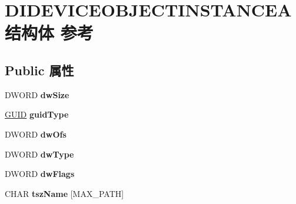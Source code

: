 \hypertarget{struct_d_i_d_e_v_i_c_e_o_b_j_e_c_t_i_n_s_t_a_n_c_e_a}{}\section{D\+I\+D\+E\+V\+I\+C\+E\+O\+B\+J\+E\+C\+T\+I\+N\+S\+T\+A\+N\+C\+E\+A结构体 参考}
\label{struct_d_i_d_e_v_i_c_e_o_b_j_e_c_t_i_n_s_t_a_n_c_e_a}
\subsection*{Public 属性}
\begin{DoxyCompactItemize}
\item 
\mbox{\label{struct_d_i_d_e_v_i_c_e_o_b_j_e_c_t_i_n_s_t_a_n_c_e_a_a0d55894b80f8e6ec487e7e7aa6f71254}} 
D\+W\+O\+RD {\bfseries dw\+Size}
\item 
\mbox{\label{struct_d_i_d_e_v_i_c_e_o_b_j_e_c_t_i_n_s_t_a_n_c_e_a_a670f89173fa4625ce5e57278050a887f}} 
\hyperlink{interface_g_u_i_d}{G\+U\+ID} {\bfseries guid\+Type}
\item 
\mbox{\label{struct_d_i_d_e_v_i_c_e_o_b_j_e_c_t_i_n_s_t_a_n_c_e_a_a16bb7716c0c959f048226ea0b8c190bd}} 
D\+W\+O\+RD {\bfseries dw\+Ofs}
\item 
\mbox{\label{struct_d_i_d_e_v_i_c_e_o_b_j_e_c_t_i_n_s_t_a_n_c_e_a_abbd0ecf057054a822de3174c511c5fd1}} 
D\+W\+O\+RD {\bfseries dw\+Type}
\item 
\mbox{\label{struct_d_i_d_e_v_i_c_e_o_b_j_e_c_t_i_n_s_t_a_n_c_e_a_a1ecf2634b90d68931f9790e84ef1cb5f}} 
D\+W\+O\+RD {\bfseries dw\+Flags}
\item 
\mbox{\label{struct_d_i_d_e_v_i_c_e_o_b_j_e_c_t_i_n_s_t_a_n_c_e_a_aec932f05a7ebb2b5cba0503424626aae}} 
C\+H\+AR {\bfseries tsz\+Name} \mbox{[}M\+A\+X\+\_\+\+P\+A\+TH\mbox{]}
\item 
\mbox{\label{struct_d_i_d_e_v_i_c_e_o_b_j_e_c_t_i_n_s_t_a_n_c_e_a_a3592d183014f1c2d64ad28bdb27f88ef}} 

\end{DoxyCompactItemize}

